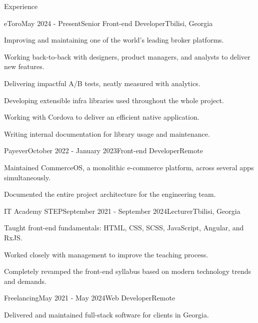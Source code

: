 \documentclass[
	a4paper,
	11pt,
]{resume}
\begin{document}
\begin{rSection}{Experience}

	\begin{rSubsection}{eToro}{May 2024 - Present}{Senior Front-end Developer}{Tbilisi, Georgia}
		\item Improving and maintaining one of the world's leading broker platforms.
		\item Working back-to-back with designers, product managers, and analysts to deliver new features.
		\item Delivering impactful A/B tests, neatly measured with analytics.
		\item Developing extensible infra libraries used throughout the whole project.
		\item Working with Cordova to deliver an efficient native application.
		\item Writing internal documentation for library usage and maintenance.
	\end{rSubsection}

	\begin{rSubsection}{Payever}{October 2022 - January 2023}{Front-end Developer}{Remote}
		\item Maintained CommerceOS, a monolithic e-commerce platform, across several apps simultaneously.
		\item Documented the entire project architecture for the engineering team.
	\end{rSubsection}

	\begin{rSubsection}{IT Academy STEP}{September 2021 - September 2024}{Lecturer}{Tbilisi, Georgia}
		\item Taught front-end fundamentals: HTML, CSS, SCSS, JavaScript, Angular, and RxJS.
		\item Worked closely with management to improve the teaching process.
		\item Completely revamped the front-end syllabus based on modern technology trends and demands.
	\end{rSubsection}

	\begin{rSubsection}{Freelancing}{May 2021 - May 2024}{Web Developer}{Remote}
		\item Delivered and maintained full-stack software for clients in Georgia.
	\end{rSubsection}

\end{rSection}

\end{document}
